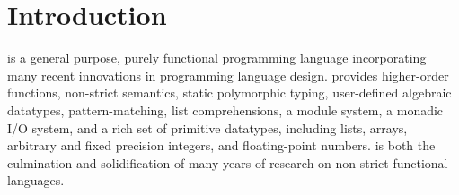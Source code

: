 %
%
\chapter{Introduction}
\label{introduction}

\Haskell{} is a general purpose, purely functional
programming language incorporating many recent innovations in
programming language design.  \Haskell{} provides 
higher-order functions,
non-strict semantics, static polymorphic typing, user-defined
algebraic datatypes, pattern-matching, list comprehensions, a module
system, a monadic I/O system, and a rich set of primitive datatypes,
including lists,
arrays, arbitrary and fixed precision integers, and floating-point
numbers.  \Haskell{} is both the culmination
and solidification of many years of research on non-strict functional
languages.





